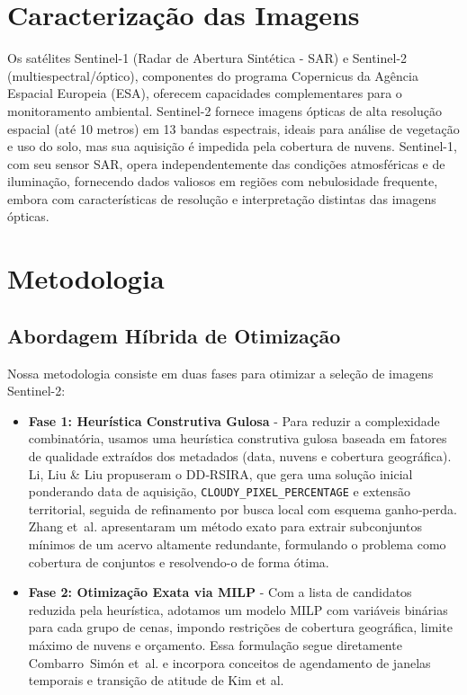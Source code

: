\documentclass[a4paper,11pt]{article}
\begin{document}
\section{Caracterização das Imagens}
Os satélites Sentinel-1 (Radar de Abertura Sintética - SAR) e Sentinel-2 (multiespectral/óptico), componentes do programa Copernicus da Agência Espacial Europeia (ESA), oferecem capacidades complementares para o monitoramento ambiental. Sentinel-2 fornece imagens ópticas de alta resolução espacial (até 10 metros) em 13 bandas espectrais, ideais para análise de vegetação e uso do solo, mas sua aquisição é impedida pela cobertura de nuvens. Sentinel-1, com seu sensor SAR, opera independentemente das condições atmosféricas e de iluminação, fornecendo dados valiosos em regiões com nebulosidade frequente, embora com características de resolução e interpretação distintas das imagens ópticas.

\section{Metodologia}

\subsection{Abordagem Híbrida de Otimização}
Nossa metodologia consiste em duas fases para otimizar a seleção de imagens Sentinel-2:

\begin{itemize}
    \item \textbf{Fase 1: Heurística Construtiva Gulosa} - Para reduzir a complexidade combinatória, usamos uma heurística construtiva gulosa baseada em fatores de qualidade extraídos dos metadados (data, nuvens e cobertura geográfica). Li, Liu \& Liu propuseram o DD‑RSIRA, que gera uma solução inicial ponderando data de aquisição, \texttt{CLOUDY\_PIXEL\_PERCENTAGE} e extensão territorial, seguida de refinamento por busca local com esquema ganho‑perda. Zhang et al. apresentaram um método exato para extrair subconjuntos mínimos de um acervo altamente redundante, formulando o problema como cobertura de conjuntos e resolvendo-o de forma ótima.
    \item \textbf{Fase 2: Otimização Exata via MILP} - Com a lista de candidatos reduzida pela heurística, adotamos um modelo MILP com variáveis binárias para cada grupo de cenas, impondo restrições de cobertura geográfica, limite máximo de nuvens e orçamento. Essa formulação segue diretamente Combarro Simón et al. e incorpora conceitos de agendamento de janelas temporais e transição de atitude de Kim et al.
\end{itemize}
\end{document}
